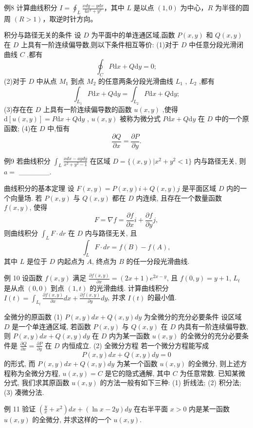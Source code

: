 例8 计算曲线积分 \(I = \oint_{L} \frac{xdy - ydx}{4x^2 + y^2}\)，其中 \(L\) 是以点 \((1,0)\) 为中心，\(R\) 为半径的圆周 \((R > 1)\)，取逆时针方向。

积分与路径无关的条件
设 \(D\) 为平面中的单连通区域,函数 \(P(x,y)\) 和 \(Q(x,y)\) 在 \(D\) 上具有一阶连续偏导数,则以下条件相互等价:
(1)对于 \(D\) 中任意分段光滑闭曲线 \(C\) ,都有
\[\oint_{C}P\mathrm{d}x + Q\mathrm{d}y = 0;\]
(2)对于 \(D\) 中从点 \(M_{1}\) 到点 \(M_{2}\) 的任意两条分段光滑曲线 \(L_{1}\) , \(L_{2}\) ,都有
\[\int_{L_{1}}P\mathrm{d}x + Q\mathrm{d}y = \int_{L_{2}}P\mathrm{d}x + Q\mathrm{d}y;\]
(3)存在在 \(D\) 上具有一阶连续偏导数的函数 \(u(x,y)\) ,使得 \(\mathrm{d}[u(x,y)] = P\mathrm{d}x + Q\mathrm{d}y\) , \(u(x,y)\) 被称为微分式 \(P\mathrm{d}x + Q\mathrm{d}y\) 在 \(D\) 中的一个原函数;
(4)在 \(D\) 中,恒有
\[\frac{\partial Q}{\partial x} = \frac{\partial P}{\partial y}.\]

例9 若曲线积分 \(\int_{L} \frac{xdx - aydy}{x^2 + y^2 - 1}\) 在区域 \(D = \{(x, y) | x^2 + y^2 < 1\}\) 内与路径无关, 则 \(a =\) ______.

曲线积分的基本定理
设 \(F(x,y) = P(x,y)i + Q(x,y)j\) 是平面区域 \(D\) 内的一个向量场. 若 \(P(x,y)\) 与 \(Q(x,y)\) 都在 \(D\) 内连续, 且存在一个数量函数 \(f(x,y)\), 使得
\[F = \nabla f = \frac{\partial f}{\partial x}i + \frac{\partial f}{\partial y}j,\]
则曲线积分 \(\int_L F \cdot dr\) 在 \(D\) 内与路径无关, 且
\[\int_L F \cdot dr = f(B) - f(A),\]
其中 \(L\) 是位于 \(D\) 内起点为 \(A\), 终点为 \(B\) 的任一分段光滑曲线.

例 10
设函数 \(f(x,y)\) 满足 \(\frac{\partial f(x,y)}{\partial x} = (2x+1)e^{2x-y}\), 且 \(f(0,y) = y+1\), \(L_t\) 是从点 \((0,0)\) 到点 \((1,t)\) 的光滑曲线. 计算曲线积分 \(I(t) = \int_{L_t} \frac{\partial f(x,y)}{\partial x} dx + \frac{\partial f(x,y)}{\partial y} dy\), 并求 \(I(t)\) 的最小值.

全微分的原函数
(1) \(P(x,y)dx + Q(x,y)dy\) 为全微分的充分必要条件 设区域 \(D\) 是一个单连通区域, 若函数 \(P(x,y)\) 与 \(Q(x,y)\) 在 \(D\) 内具有一阶连续偏导数, 则 \(P(x,y)dx + Q(x,y)dy\) 在 \(D\) 内为某一函数 \(u(x,y)\) 的全微分的充分必要条件是 \(\frac{\partial Q}{\partial x} = \frac{\partial P}{\partial y}\) 在 \(D\) 内恒成立.
(2) 全微分方程 若一个微分方程能写成
\[P(x,y)dx + Q(x,y)dy = 0\]
的形式, 而 \(P(x,y)dx + Q(x,y)dy\) 为某一个函数 \(u(x,y)\) 的全微分, 则上述方程称为全微分方程, \(u(x,y) = C\) 是它的隐式通解, 其中 \(C\) 为任意常数.
已知某微分式, 我们求其原函数 \(u(x,y)\) 的方法一般有如下三种:
(1) 折线法; (2) 积分法; (3) 凑微分法.

例 11
验证 \((\frac{y}{x} + x^2) dx + (\ln x - 2y) dy\) 在右半平面 \(x > 0\) 内是某一函数 \(u(x, y)\) 的全微分, 并求这样的一个 \(u(x, y)\).

